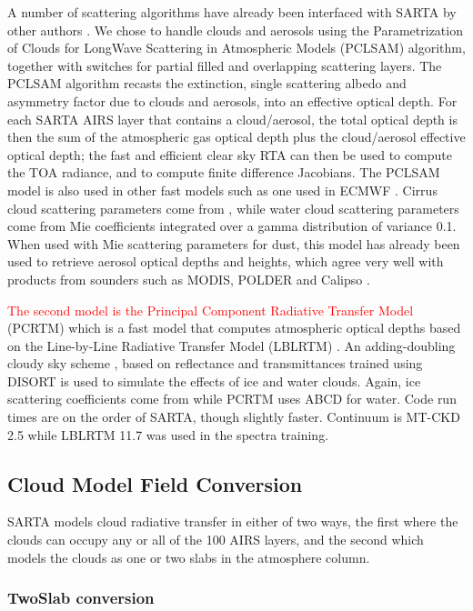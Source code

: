 \documentclass[agupp]{aguplus}              %
\begin{document}
\begin{article}
A number of scattering algorithms have already been interfaced with
SARTA by other authors \cite{niu:07}. We chose to handle clouds and
aerosols using the Parametrization of Clouds for LongWave Scattering
in Atmospheric Models (PCLSAM) \cite{cho:99} algorithm, together with
switches for partial filled and overlapping scattering layers. The
PCLSAM algorithm recasts the extinction, single scattering albedo and
asymmetry factor due to clouds and aerosols, into an effective optical
depth. For each SARTA AIRS layer that contains a cloud/aerosol, the
total optical depth is then the sum of the atmospheric gas optical
depth plus the cloud/aerosol effective optical depth; the fast and
efficient clear sky RTA can then be used to compute the TOA radiance,
and to compute finite difference Jacobians. The PCLSAM model is also
used in other fast models such as one used in ECMWF
\cite{mat:05}. Cirrus cloud scattering parameters come from
\citep{bau:07,bau:11}, while water cloud scattering parameters come
from Mie coefficients integrated over a gamma distribution of variance
0.1. When used with Mie scattering parameters for dust, this model has
already been used to retrieve aerosol optical depths and heights,
which agree very well with products from sounders such as MODIS,
POLDER and Calipso \citep{mac:10}.

\textcolor{red}{The second model is the Principal Component Radiative
Transfer Model} (PCRTM) which is a fast model that computes
atmospheric optical depths based on the Line-by-Line Radiative
Transfer Model (LBLRTM) \citep{liu:06}. An adding-doubling cloudy sky
scheme \citep{liu:09}, based on reflectance and transmittances trained
using DISORT \cite{stam:88} is used to simulate the effects of ice and
water clouds. Again, ice scattering coefficients come from
\citep{bau:11} while PCRTM uses ABCD for water. Code run times are on
the order of SARTA, though slightly faster. Continuum
is MT-CKD 2.5 while LBLRTM 11.7 was used in the spectra training.

\subsection{Cloud Model Field Conversion} 

SARTA models cloud radiative transfer in either of two ways, the first
where the clouds can occupy any or all of the 100 AIRS layers, and the
second which models the clouds as one or two slabs in the atmosphere
column. 

\subsubsection{TwoSlab conversion}


\end{article}
\end{document}
